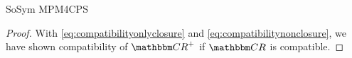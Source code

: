 \begin{copiedFrom}{SoSym MPM4CPS}
\begin{proof}
    With \autoref{eq:compatibilityonlyclosure} and \autoref{eq:compatibilitynonclosure}, we have shown compatibility of $\transitiveclosure{\consistencyrelationset{CR}}$ if $\consistencyrelationset{CR}$ is compatible.
\end{proof}






\end{copiedFrom}
